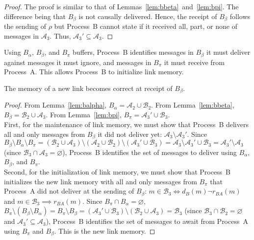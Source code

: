 \begin{proof}
  The proof is similar to that of Lemmas~\ref{lem:bbeta}~and~\ref{lem:bpi}. The
  difference being that $B_\beta$ is not causally delivered. Hence, the receipt
  of $B_\beta$ follows the sending of $\rho$ but Process~B cannot state if it
  received all, part, or none of messages in $\mathcal{A}_3$. Thus,
  $\mathcal{A}_3' \subseteq \mathcal{A}_3$.
\end{proof}

\noindent Using $B_\alpha$, $B_\beta$, and $B_\pi$ buffers, Process~B identifies
messages in $B_\beta$ it must deliver against messages it must ignore, and
messages in $B_\pi$ it must receive from Process~A. This allows Process~B to
initialize link memory.

\begin{theorem}
  The memory of a new link becomes correct at receipt of $B_\beta$.
\end{theorem}

\begin{proof}
  From Lemma~\ref{lem:balpha}, $B_\alpha = \mathcal{A}_2 \cup \mathcal{B}_2$.
  From Lemma~\ref{lem:bbeta}, $B_\beta= \mathcal{B}_2 \cup \mathcal{A}_3$. From
  Lemma~\ref{lem:bpi}, $B_\pi = \mathcal{A}_3' \cup \mathcal{B}_3$. \\ First,
  for the maintenance of link memory, we must show that Process~B delivers all
  and only messages from $B_\beta$ it did not deliver yet:
  $\mathcal{A}_3 \setminus \mathcal{A}_3'$. Since
  $B_\beta \setminus B_\alpha \setminus B_\pi = (\mathcal{B}_2 \cup
  \mathcal{A}_3) \setminus (\mathcal{A}_2 \cup \mathcal{B}_2) \setminus
  (\mathcal{A}_3' \cup \mathcal{B}_3) = \mathcal{A}_3 \setminus \mathcal{A}_3'
  \cup \mathcal{B}_3 = \mathcal{A}_3'\setminus \mathcal{A}_3$
  (since $\mathcal{B}_3 \cap \mathcal{A}_3 = \varnothing$), Process~B identifies
  the set of messages to deliver using $B_\alpha$, $B_\beta$, and $B_\pi$. \\
  Second, for the initialization of link memory, we must show that Process~B
  initializes the new link memory with all and only messages from $B_\pi$ that
  Process~A did not deliver at the sending of $B_\beta$:
  $m \in \mathcal{B}_3 \Leftrightarrow d_B(m) \neg r_{BA}(m)$ and
  $m \in \mathcal{B}_3 \implies r_{BA}(m)$.  Since
  $B_\pi \cap B_\alpha = \varnothing$,
  $B_\pi \setminus (B_\beta \setminus B_\alpha)= B_\pi \setminus B_\beta =
  (\mathcal{A}_3' \cup \mathcal{B}_3) \setminus (\mathcal{B}_2 \cup
  \mathcal{A}_3) = \mathcal{B}_3$
  (since $\mathcal{B}_3 \cap \mathcal{B}_2 = \varnothing$ and
  $\mathcal{A}_3' \subseteq \mathcal{A}_3$), Process~B identifies the set of
  messages to await from Process~A using $B_\pi$ and $B_\beta$. This is the new
  link memory.
\end{proof}



